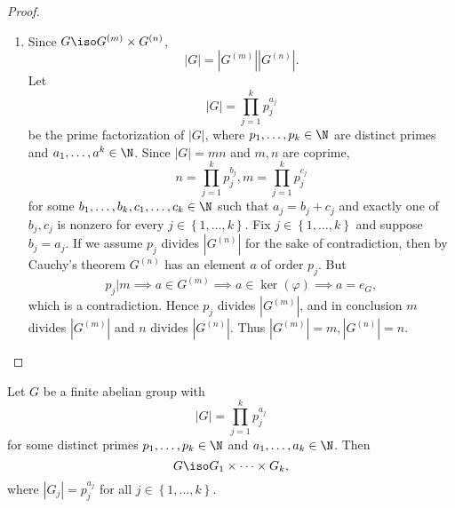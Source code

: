 \documentclass[pmath347]{subfiles}
\begin{document}
\begin{proof}
\begin{enumerate}
            \item Since $G\iso G^{\left( m \right)}\times G^{\left( n \right) }$,
                \begin{equation*}
                    \left| G \right| = \left| G^{\left( m \right) } \right| \left| G^{\left( n \right) } \right| .
                \end{equation*}
                Let
                \begin{equation*}
                    \left| G \right| = \prod^{k}_{j=1} p_j^{a_j}
                \end{equation*}
                be the prime factorization of $\left| G \right|$, where $p_1,\ldots,p_k\in\N$ are distinct primes and $a_1,\ldots,a^k\in\N$. Since $\left| G \right| = mn$ and $m,n$ are coprime,
                \begin{equation*}
                    n = \prod^{k}_{j=1} p_j^{b_j}, m = \prod^{k}_{j=1} p_j^{c_j}
                \end{equation*}
                for some $b_1,\ldots,b_k,c_1,\ldots,c_k\in\N$ such that $a_j = b_j + c_j$ and exactly one of $b_j, c_j$ is nonzero for every $j\in\left\lbrace 1,\ldots,k \right\rbrace$. Fix $j\in\left\lbrace 1,\ldots,k \right\rbrace$ and suppose $b_j=a_j$. If we assume $p_j$ divides $\left| G^{\left( n \right) } \right|$ for the sake of contradiction, then by Cauchy's theorem $G^{\left( n \right) }$ has an element $a$ of order $p_j$. But
                \begin{equation*}
                    p_j|m \implies a\in G^{\left( m \right) } \implies a\in\ker\left( \varphi \right) \implies a=e_G,
                \end{equation*}
                which is a contradiction. Hence $p_j$ divides $\left| G^{\left( m \right) } \right|$, and in conclusion $m$ divides $\left| G^{\left( m \right) } \right| $ and $n$ divides $\left| G^{\left( n \right) } \right| $. Thus $\left| G^{\left( m \right) } \right| = m, \left| G^{\left( n \right) } \right| = n$. \qqedsym
        \end{enumerate}
    \end{proof}

    \begin{cor}{}
        Let $G$ be a finite abelian group with
        \begin{equation*}
            \left| G \right| = \prod^{k}_{j=1} p_j^{a_j}
        \end{equation*}
        for some distinct primes $p_1,\ldots,p_k\in\N$ and $a_1,\ldots,a_k\in\N$. Then
        \begin{equation*}
            G\iso G_1\times\cdots\times G_k,
        \end{equation*}
        where $\left| G_j \right| = p_j^{a_j}$ for all $j\in\left\lbrace 1,\ldots,k \right\rbrace$.
    \end{cor}	
\end{document}
